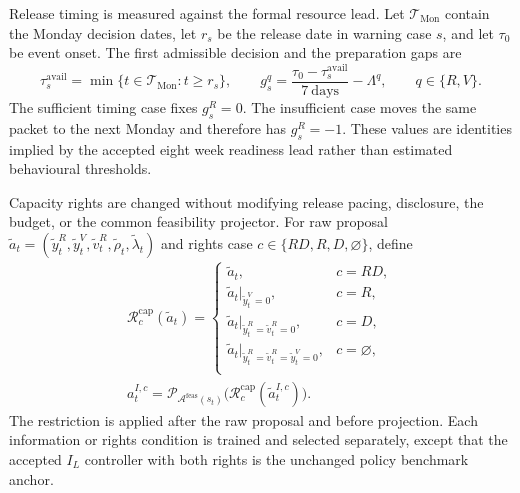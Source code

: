 \documentclass[a4paper,fleqn]{cas-sc}
\begin{document}
Release timing is measured against the formal resource lead. Let
$\mathcal T_{\mathrm{Mon}}$ contain the Monday decision dates, let $r_s$ be the
release date in warning case $s$, and let $\tau_0$ be event onset. The first
admissible decision and the preparation gaps are
\begin{equation}
 \tau_s^{\mathrm{avail}}
 =\min\{t\in\mathcal T_{\mathrm{Mon}}:t\ge r_s\},
 \qquad
 g_s^q=\frac{\tau_0-\tau_s^{\mathrm{avail}}}{7\ \mathrm{days}}
 -\Lambda^q,
 \qquad q\in\{R,V\}.
 \label{eq:information-release-gap-524}
\end{equation}
The sufficient timing case fixes $g_s^R=0$. The insufficient case moves the
same packet to the next Monday and therefore has $g_s^R=-1$. These values are
identities implied by the accepted eight week readiness lead rather than
estimated behavioural thresholds.

Capacity rights are changed without modifying release pacing, disclosure, the
budget, or the common feasibility projector. For raw proposal
$\widetilde a_t=(\widetilde y_t^R,\widetilde y_t^V,
\widetilde v_t^R,\widetilde\rho_t,\widetilde\lambda_t)$ and rights case
$c\in\{RD,R,D,\varnothing\}$, define
\begin{equation}
 \begin{gathered}
 \mathcal R_c^{\mathrm{cap}}(\widetilde a_t)=
 \begin{cases}
 \widetilde a_t,&c=RD,\\
 \widetilde a_t\big|_{\widetilde y_t^V=0},&c=R,\\
 \widetilde a_t\big|_{\widetilde y_t^R=\widetilde v_t^R=0},&c=D,\\
 \widetilde a_t\big|_{\widetilde y_t^R=\widetilde v_t^R=
 \widetilde y_t^V=0},&c=\varnothing,\\
 \end{cases}\\
 a_t^{I,c}=\mathcal P_{\mathcal A^{\mathrm{feas}}(s_t)}
 \bigl(\mathcal R_c^{\mathrm{cap}}(\widetilde a_t^{I,c})\bigr).
 \end{gathered}
 \label{eq:capacity-rights-524}
\end{equation}
The restriction is applied after the raw proposal and before projection. Each
information or rights condition is trained and selected separately, except that
the accepted $I_L$ controller with both rights is the unchanged policy benchmark
anchor.
\end{document}
